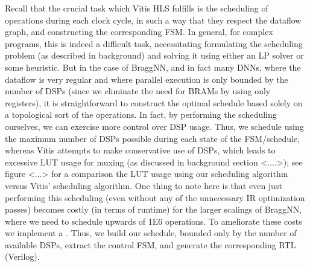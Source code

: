 Recall that the crucial task which Vitis HLS fulfills is the scheduling of operations during each clock cycle, in such a way that they respect the dataflow graph, and constructing the corresponding FSM.
In general, for complex programs, this is indeed a difficult task, necessitating formulating the scheduling problem (as described in background) and solving it using either an LP solver or some heuristic.
But in the case of BraggNN, and in fact many DNNs, where the dataflow is very regular and where parallel execution is only bounded by the number of DSPs (since we eliminate the need for BRAMs by using only registers), it is straightforward to construct the optimal schedule based solely on a topological sort of the operations.
In fact, by performing the scheduling ourselves, we can exercise more control over DSP usage.
Thus, we schedule using the maximum number of DSPs possible during each state of the FSM/schedule, whereas Vitis attempts to make conservative use of DSPs, which leads to excessive LUT usage for muxing (as discussed in background section <....>); see figure <...> for a comparison the LUT usage using our scheduling algorithm versus Vitis' scheduling algorithm.
One thing to note here is that even just performing this scheduling (even without any of the unnecessary IR optimization passes) becomes costly (in terms of runtime) for the larger scalings of BraggNN, where we need to schedule upwards of 1E6 operations.
To ameliorate these costs we implement a .
Thus, we build our schedule, bounded only by the number of available DSPs, extract the control FSM, and generate the corresponding RTL (Verilog).

